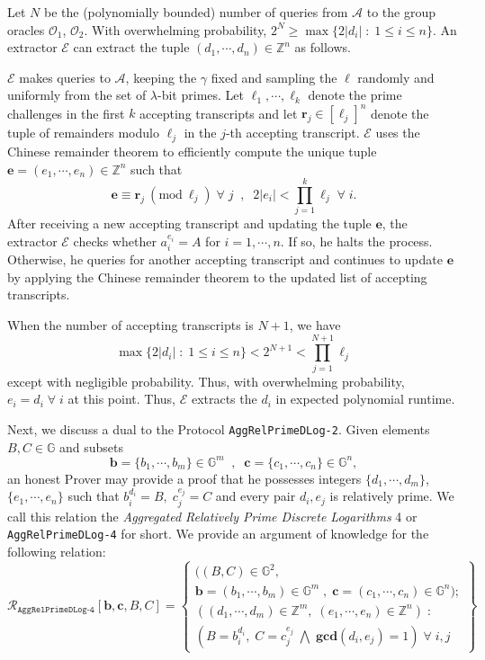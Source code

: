 \documentclass[11pt, lettersize, notitlepage, leqno, footskip=0.6cm]{article}
\newcommand{\bz}{\mathbb Z}
\newcommand{\pl}{\prod\limits}
\newcommand{\ttt}{\texttt}
\newcommand{\mc}{\mathcal}
\newcommand{\mb}{\mathbb}
\newcommand{\mbf}{\mathbf}
\newcommand{\lam}{\lambda}
\newcommand{\A}{\mc{A}}
\newcommand{\vs}{\vspace{-0.15cm}}
\newcommand{\op}{overwhelming probability}
\newcommand{\np}{negligible probability}
\newcommand{\Mod}[1]{\ (\mathrm{mod}\ #1)}
\newcommand{\GCD}{\mbf{gcd}}
\newcommand{\E}{\mc{E}}
\numberwithin{equation}{section}
\begin{document}
\begin{prf}
Let $N$ be the (polynomially bounded) number of queries from $\A$ to the group oracles $\mc{O}_1$, $\mc{O}_2$. With \op, $2^{N} \geq \max\{2|d_i|\;:\;1\leq i\leq n \}$. An extractor $\E$ can extract the tuple $(d_1,\cdots,d_n)\in\bz^n$ as follows. 

$\E$ makes queries to $\A$, keeping the $\gamma$ fixed and sampling the $\ell$ randomly and uniformly from the set of $\lam$-bit primes. Let $\ell_1,\cdots,\ell_{k}$ denote the prime challenges in the first $k$ accepting transcripts and let $\mbf{r}_j\in [\ell_j]^n$ denote the tuple of remainders modulo $\ell_j$ in the $j$-th accepting transcript. $\E$ uses the Chinese remainder theorem to efficiently compute the unique tuple $\mbf{e} = (e_1,\cdots,e_n)\in \bz^n$ such that \vs $$\mbf{e}\equiv \mbf{r}_j\Mod{\ell_j}\;\forall\; j\;\;,\;\;2|e_i|< \pl_{j=1}^{k} \ell_j\;\forall\; i.$$ After receiving a new accepting transcript and updating the tuple $\mbf{e}$, the extractor $\E$ checks whether $a_i^{e_i} = A$ for $i=1,\cdots,n$. If so, he halts the process. Otherwise, he queries for another accepting transcript and continues to update $\mbf{e}$ by applying the Chinese remainder theorem to the updated list of accepting transcripts.

When the number of accepting transcripts is $N+1$, we have \vs $$\max\{2|d_i|\;:\;1\leq i\leq n \} < 2^{N+1} < \pl_{j=1}^{N+1}\ell_j$$ except with \np. Thus, with \op, $e_i = d_i\;\forall\;i$ at this point. Thus, $\E$ extracts the $d_i$ in expected polynomial runtime. \end{prf}



\bigskip

Next, we discuss a dual to the Protocol \verb|AggRelPrimeDLog-2|. Given elements $B, C\in \mb{G}$ and subsets \vspace{-0.15cm}$$\mbf{b} = \{b_1,\cdots, b_m\}\in \mb{G}^m \;\;,\;\; \mbf{c} = \{c_1,\cdots, c_n\}\in \mb{G}^n,$$ an honest Prover may provide a proof that he possesses integers $\{d_1,\cdots, d_m\}$, $\{e_1,\cdots, e_n\}$ such that $b_i^{d_i} = B,\; c_j^{e_j} = C$ and every pair $d_i, e_j$ is relatively prime. We call this relation the \textit{Aggregated Relatively Prime Discrete Logarithms} 4 or \verb|AggRelPrimeDLog-4| for short. We provide an argument of knowledge for the following relation:
\[
  \mc{R}_{\ttt{AggRelPrimeDLog-4}}[\mbf{b}, \mbf{c}, B, C] = \left\{\begin{array}{l}
    ((B,C)\in\mb{G}^2,\;\\
     \mbf{b} = (b_1,\cdots,b_m)\in\mb{G}^m\;,\;\mbf{c} = (c_1,\cdots, c_n)\in\mb{G}^n);\\
    ((d_1,\cdots,d_m)\in\bz^m,\; (e_1,\cdots,e_n)\in\bz^n)\;: \\
    (B = b_i^{d_i},\; C = c_j^{e_j}\;\bigwedge \; \GCD(d_i, e_j) = 1)\;\forall \;i,j
  \end{array}\right\}
\] 
\end{document}
